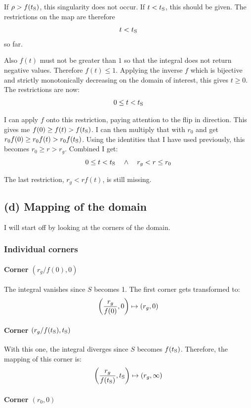 If $\rho > f(t_\mathrm S)$, this singularity does not occur. If $t < t_\mathrm S$, this should
be given. The restrictions on the map are therefore
\[
    t < t_\mathrm S
\]
so far.

Also $f(t)$ must not be greater than $1$ so that the integral does not return
negative values. Therefore $f(t) \leq 1$. Applying the inverse $f$ which is
bijective and strictly monotonically decreasing on the domain of interest, this
gives $t \geq 0$. The restrictions are now:
\[
    0 \leq t < t_\mathrm S
\]

I can apply $f$ onto this restriction, paying attention to the flip in
direction. This gives me $f(0) \geq f(t) > f(t_\mathrm S)$. I can then multiply that with
$r_0$ and get $r_0 f(0) \geq r_0 f(t) > r_0 f(t_\mathrm S)$. Using the identities that
I have used previously, this becomes $r_0 \geq r > r_g$. Combined I get:
\[
    0 \leq t < t_\mathrm S
    \quad\land\quad
    r_g < r \leq r_0
\]

The last restriction, $r_g < r f(t)$, is still missing.

\subsection*{(d) Mapping of the domain}

I will start off by looking at the corners of the domain.

\subsubsection*{Individual corners}

\paragraph{Corner $(r_g/f(0), 0)$}

The integral vanishes since $S$ becomes 1. The first corner gets transformed
to:
\[
    \del{\frac{r_g}{f(0)}, 0} \mapsto (r_g, 0)
\]

\paragraph{Corner $(r_g/f(t_\mathrm S), t_\mathrm S)$}

With this one, the integral diverges since $S$ becomes $f(t_\mathrm S)$. Therefore, the
mapping of this corner is:
\[
    \del{\frac{r_g}{f(\tS)}, \tS} \mapsto (r_g, \infty)
\]

\paragraph{Corner $(r_0, 0)$}

